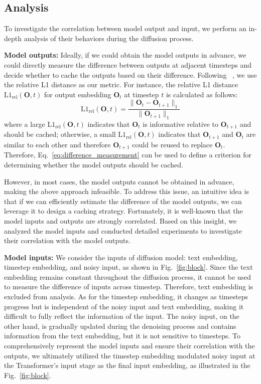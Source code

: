 \subsection{Analysis}
To investigate the correlation between model output and input, we perform an in-depth analysis of their behaviors during the diffusion process. 

\textbf{Model outputs:} Ideally, if we could obtain the model outputs in advance, we could directly measure the difference between outputs at adjacent timesteps and decide whether to cache the outputs based on their difference. 
Following ~\cite{wimbauer2024cache}, we use the relative L1 distance as our metric. For instance, the relative L1 distance $\text{L1}_{\text{rel}}(\mathbf{O}, t)$ for output embedding $\mathbf{O}_t$ at timestep $t$ is calculated as follows:
\begin{equation}
\text{L1}_{\text{rel}}(\mathbf{O}, t) = \frac{\|\mathbf{O}_t - \mathbf{O}_{t+1}\|_1}{\|\mathbf{O}_{t+1}\|_1}
\label{eq:difference_measurement}
\end{equation}
where a large $\text{L1}_{\text{rel}}(\mathbf{O}, t)$ indicates that $\mathbf{O}_t$ is informative relative to $\mathbf{O}_{t+1}$ and should be cached; otherwise, a small $\text{L1}_{\text{rel}}(\mathbf{O}, t)$ indicates that $\mathbf{O}_{t+1}$ and $\mathbf{O}_t$ are similar to each other and therefore $\mathbf{O}_{t+1}$ could be reused to replace $\mathbf{O}_{t}$. Therefore, Eq.~\ref{eq:difference_measurement} can be used to define a criterion for determining whether the model outputs should be cached.

However, in most cases, the model outputs cannot be obtained in advance, making the above approach infeasible. To address this issue, an intuitive idea is that if we can efficiently estimate the difference of the model outputs, we can leverage it to design a caching strategy. Fortunately, it is well-known that the model inputs and outputs are strongly correlated. Based on this insight, we analyzed the model inputs and conducted detailed experiments to investigate their correlation with the model outputs.

\textbf{Model inputs:} We consider the inputs of diffusion model: text embedding, timestep embedding, and noisy input, as shown in Fig.~\ref{fig:block}. Since the text embedding remains constant throughout the diffusion process, it cannot be used to measure the difference of inputs across timestep. Therefore, text embedding is excluded from analysis. As for the timestep embedding, it changes as timesteps progress but is independent of the noisy input and text embedding, making it difficult to fully reflect the information of the input. The noisy input, on the other hand, is gradually updated during the denoising process and contains information from the text embedding, but it is not sensitive to timesteps. To comprehensively represent the model inputs and ensure their correlation with the outputs, we ultimately utilized the timestep embedding modulated noisy input at the Transformer’s input stage as the final input embedding, as illustrated in the Fig.~\ref{fig:block}.

